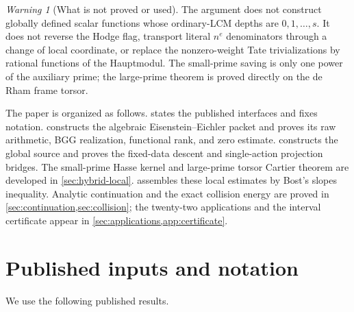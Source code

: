 \documentclass[11pt]{article}
\theoremstyle{definition}
\theoremstyle{remark}
\newtheorem{warning}[warning]{Warning}
\begin{document}
\begin{warning}[What is not proved or used]\label{warn:no-scalarization}
The argument does not construct globally defined scalar functions whose
ordinary-LCM depths are $0,1,\ldots,s$.  It does not reverse the Hodge flag,
transport literal $n^e$ denominators through a change of local coordinate, or
replace the nonzero-weight Tate trivializations by rational functions of the
Hauptmodul.  The small-prime saving is only one power of the auxiliary prime;
the large-prime theorem is proved directly on the de Rham frame torsor.
\end{warning}

The paper is organized as follows.   states the published
interfaces and fixes notation.   constructs the algebraic
Eisenstein--Eichler packet and proves its raw arithmetic, BGG realization,
functional rank, and zero estimate.   constructs the global
source and proves the fixed-data descent and single-action projection bridges.  The small-prime Hasse
kernel and large-prime torsor Cartier theorem are developed in
\cref{sec:hybrid-local}.   assembles these local estimates by
Bost's slopes inequality.  Analytic continuation and the exact collision
energy are proved in \cref{sec:continuation,sec:collision}; the twenty-two
applications and the interval certificate appear in
\cref{sec:applications,app:certificate}.

\section{Published inputs and notation}\label{sec:inputs}

We use the following published results.
\end{document}

